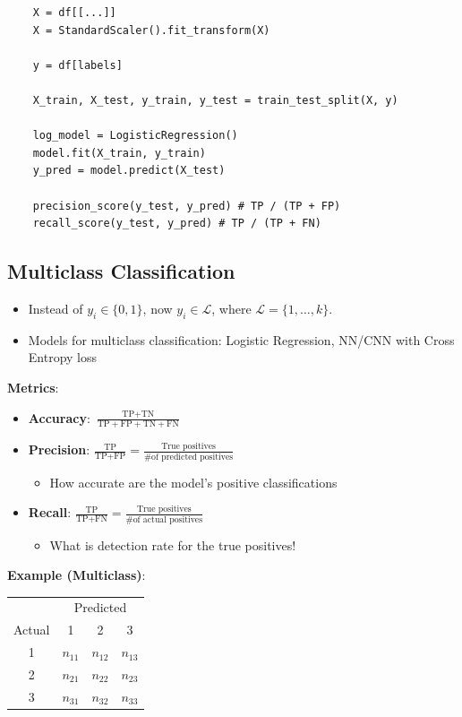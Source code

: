 \documentclass{article}
\begin{document}
\begin{verbatim}
    X = df[[...]]
    X = StandardScaler().fit_transform(X)

    y = df[labels]

    X_train, X_test, y_train, y_test = train_test_split(X, y)
    
    log_model = LogisticRegression()
    model.fit(X_train, y_train)
    y_pred = model.predict(X_test)

    precision_score(y_test, y_pred) # TP / (TP + FP)
    recall_score(y_test, y_pred) # TP / (TP + FN)
\end{verbatim}

\subsection{Multiclass Classification}
\begin{itemize}
    \item Instead of $y_i \in \{0, 1\}$, now $y_i \in \mathcal{L}$, where $\mathcal{L} = \{1, \ldots, k\}$.
    \item Models for multiclass classification: Logistic Regression, NN/CNN with Cross Entropy loss
\end{itemize}

\textbf{Metrics}:
\begin{itemize}
    \item \textbf{Accuracy}: $\displaystyle\frac{\text{TP} + \text{TN}}{\text{TP} + \text{FP} + \text{TN} + \text{FN}}$
    \item \textbf{Precision}: $\displaystyle\frac{\text{TP}}{\text{TP} + \text{FP}} = \frac{\text{True positives}}{\text{\# of predicted positives}}$
        \begin{itemize}
            \item How accurate are the model's positive classifications
        \end{itemize}
    \item \textbf{Recall}: $\displaystyle\frac{\text{TP}}{\text{TP} + \text{FN}} = \frac{\text{True positives}}{\text{\# of actual positives}}$
        \begin{itemize}
            \item What is detection rate for the true positives!
        \end{itemize}
\end{itemize}

\textbf{Example (Multiclass)}:
\begin{center}
\begin{tabular}{c|ccc}
     & \multicolumn{3}{c}{Predicted} \\
    Actual & 1 & 2 & 3 \\
    \hline
    1 & $n_{11}$ & $n_{12}$ & $n_{13}$ \\
    2 & $n_{21}$ & $n_{22}$ & $n_{23}$ \\
    3 & $n_{31}$ & $n_{32}$ & $n_{33}$ \\
\end{tabular}
\end{center}
\end{document}
